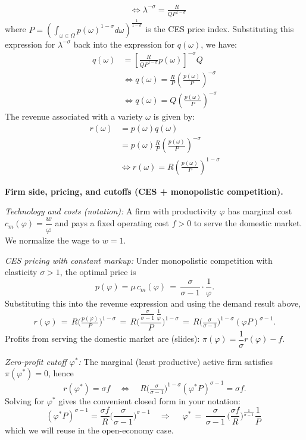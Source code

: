 \begin{solution}
\begin{align*}
        &\iff \lambda^{-\sigma} = \frac{R}{Q P^{1 - \sigma}} 
    \end{align*}
    where $P = \left( \int_{\omega \in \Omega} p(\omega)^{1 - \sigma} d\omega \right)^{\frac{1}{1 - \sigma}}$ is the CES price index. Substituting this expression for $\lambda^{-\sigma}$ back into the expression for $q(\omega)$, we have:
    \begin{align*}
        q(\omega) &= \left[ \frac{R}{Q P^{1 - \sigma}} p(\omega) \right]^{-\sigma} Q \\
        &\iff q(\omega) = \frac{R}{P} \left( \frac{p(\omega)}{P} \right)^{-\sigma}\\
        &\iff q(\omega) = Q \left( \frac{p(\omega)}{P} \right)^{-\sigma}
    \end{align*}
    The revenue associated with a variety $\omega$ is given by:
    \begin{align*}
        r(\omega) &= p(\omega) q(\omega) \\
        &= p(\omega) \frac{R}{P} \left( \frac{p(\omega)}{P} \right)^{-\sigma} \\
        &\iff r(\omega) = R \left( \frac{p(\omega)}{P} \right)^{1 - \sigma}
    \end{align*}
    
    \bigskip
    	\textbf{Firm side, pricing, and cutoffs (CES + monopolistic competition).}
    
    \emph{Technology and costs (notation):} A firm with productivity $\varphi$ has marginal cost $c_m(\varphi)=\dfrac{w}{\varphi}$ and pays a fixed operating cost $f>0$ to serve the domestic market. We normalize the wage to $w=1$.
    
    \emph{CES pricing with constant markup:} Under monopolistic competition with elasticity $\sigma>1$, the optimal price is
    \[
        p(\varphi) = \mu\, c_m(\varphi) \,=\, \frac{\sigma}{\sigma-1}\cdot\frac{1}{\varphi} .
    \]
    Substituting this into the revenue expression and using the demand result above,
    \[
        r(\varphi) \,=\, R\Big(\tfrac{p(\varphi)}{P}\Big)^{1-\sigma}
        \,=\, R\Big( \frac{\tfrac{\sigma}{\sigma-1}\,\tfrac{1}{\varphi}}{P} \Big)^{1-\sigma}
        \,=\, R\Big(\tfrac{\sigma}{\sigma-1}\Big)^{1-\sigma} (\varphi P)^{\sigma-1} .
    \]
    Profits from serving the domestic market are (slides): $\pi(\varphi) = \dfrac{1}{\sigma} r(\varphi) - f$.
    
    \emph{Zero-profit cutoff $\varphi^*$:} The marginal (least productive) active firm satisfies $\pi(\varphi^*)=0$, hence
    \[
        r(\varphi^*) = \sigma f
        \quad\Longleftrightarrow\quad
        R\Big(\tfrac{\sigma}{\sigma-1}\Big)^{1-\sigma} (\varphi^* P)^{\sigma-1} = \sigma f.
    \]
    Solving for $\varphi^*$ gives the convenient closed form in your notation:
    \[
        (\varphi^* P)^{\sigma-1} = \frac{\sigma f}{R}\Big(\frac{\sigma}{\sigma-1}\Big)^{\sigma-1}
        \quad\Rightarrow\quad
        \boxed{\;\displaystyle \varphi^* \,=\, \frac{\sigma}{\sigma-1}\,\Big(\frac{\sigma f}{R}\Big)^{\!\frac{1}{\sigma-1}} \frac{1}{P}\; } 
    \]
    which we will reuse in the open-economy case.
    

\end{solution}
